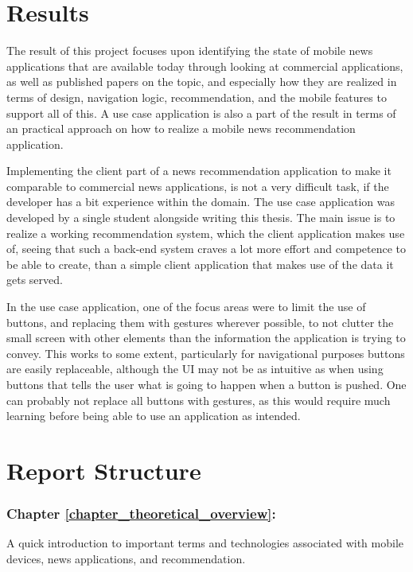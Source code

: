 \section{Results}
The result of this project focuses upon identifying the state of mobile news applications that are available today through looking at commercial applications, as well as published papers on the topic, and especially how they are realized in terms of design, navigation logic, recommendation, and the mobile features to support all of this. A use case application is also a part of the result in terms of an practical approach on how to realize a mobile news recommendation application.

Implementing the client part of a news recommendation application to make it comparable to commercial news applications, is not a very difficult task, if the developer has a bit experience within the domain. The use case application was developed by a single student alongside writing this thesis. The main issue is to realize a working recommendation system, which the client application makes use of, seeing that such a back-end system craves a lot more effort and competence to be able to create, than a simple client application that makes use of the data it gets served. 

In the use case application, one of the focus areas were to limit the use of buttons, and replacing them with gestures wherever possible, to not clutter the small screen with other elements than the information the application is trying to convey. This works to some extent, particularly for navigational purposes buttons are easily replaceable, although the UI may not be as intuitive as when using buttons that tells the user what is going to happen when a button is pushed. One can probably not replace all buttons with gestures, as this would require much learning before being able to use an application as intended. 

\section{Report Structure}

\subsubsection{Chapter \ref{chapter_theoretical_overview}: }
A quick introduction to important terms and technologies associated with mobile devices, news applications, and recommendation.

